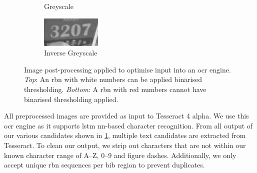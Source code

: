 \begin{figure}[h]
\begin{subfigure}[b]{0.23\textwidth}
    \caption{Greyscale}
  \end{subfigure}
  \hspace{\fill}
  \begin{subfigure}[b]{0.23\textwidth}
    \includegraphics[width=\textwidth]{images/processing/ocr/3207_bw_inv}
    \caption{Inverse Greyscale}
  \end{subfigure}
  \hspace{\fill}
  
  \caption[Image post-processing applied to optimise input into an OCR engine]{Image post-processing applied to optimise input into an \gls{ocr} engine. \textit{Top}: An \gls{rbn} with white numbers can be applied binarised thresholding. \textit{Bottom}: A \gls{rbn} with red numbers cannot have binarised thresholding applied.}
  \label{fig:processing_pipeline:ocr_postprocessing}
\end{figure}

All preprocessed images are provided as input to Tesseract 4 alpha. We use this \gls{ocr} engine as it supports \gls{lstm} \gls{nn}-based character recognition. From all output of our various candidates shown in \cref{fig:processing_pipeline:ocr_postprocessing}, multiple text candidates are extracted from Tesseract. To clean our output, we strip out characters that are not within our known character range of A--Z, 0--9 and figure dashes. Additionally, we only accept unique \gls{rbn} sequences per bib region to prevent duplicates.